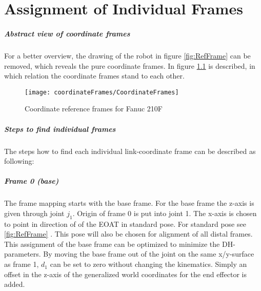 \chapter{Assignment of Individual Frames} 
\label{app:IndFrameAss}

\paragraph{Abstract view of coordinate frames}
For a better overview, the drawing of the robot in figure \ref{fig:RefFrame} can be removed, which reveals the pure coordinate frames. In figure \ref{fig:RefFrameAbstract} is described, in which relation the coordinate frames stand to each other.

\begin{figure}[H]
	\texttt{[image: coordinateFrames/CoordinateFrames]}
	\caption{Coordinate reference frames for Fanuc 210F}
	\label{fig:RefFrameAbstract}
\end{figure}

\paragraph{Steps to find individual frames}
The steps how to find each individual link-coordinate frame can be described as following:

\paragraph{Frame 0 (base)}
The frame mapping starts with the base frame. For the base frame the z-axis is given through joint $j_1$. Origin of frame 0 is put into joint 1.
The x-axis is chosen to point in direction of of the \ac{EOAT} in standard pose. For standard pose see 
\ref{fig:RefFrame}
.
This pose will also be chosen for alignment of all distal frames.
\\
This assignment of the base frame can be optimized to minimize the \ac{DH}-parameters. By moving the base frame out of the joint on the same x/y-surface as frame 1, $d_1$ can be set to zero without changing the kinematics. Simply an offset in the z-axis of the generalized world coordinates for the end effector is added.


